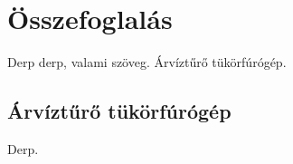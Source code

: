 \chapter{Összefoglalás}
Derp derp, valami szöveg. Árvíztűrő tükörfúrógép.


\section{Árvíztűrő tükörfúrógép}
Derp.



